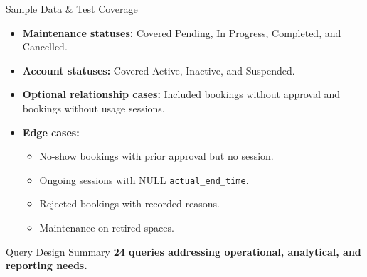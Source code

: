 \begin{frame}{Sample Data \& Test Coverage }
    \begin{itemize}
        \item \textbf{Maintenance statuses:} Covered Pending, In Progress, Completed, and Cancelled.
        \vspace{0.2cm}
        \item \textbf{Account statuses:} Covered Active, Inactive, and Suspended.
        \vspace{0.2cm}
        \item \textbf{Optional relationship cases:} Included bookings without approval and bookings without usage sessions.
        \vspace{0.2cm}
        \item \textbf{Edge cases:}    
         \begin{itemize}
            \item No-show bookings with prior approval but no session.
            \item Ongoing sessions with NULL \texttt{actual\_end\_time}.
            \item Rejected bookings with recorded reasons.
            \item Maintenance on retired spaces.
        \end{itemize}
    \end{itemize}
\end{frame}

\begin{frame}{Query Design Summary}
    \textbf{24 queries addressing operational, analytical, and reporting needs.}
    \vspace{0.3cm}
    
    \begin{table}
        \centering
    \end{table}
\end{frame}

